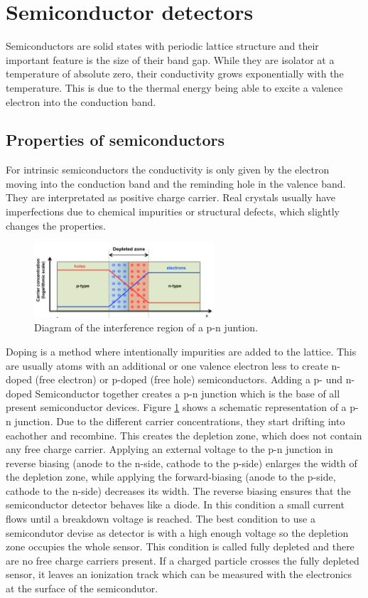 \section{Semiconductor detectors \cite{semi}}
Semiconductors are solid states with periodic lattice structure and their important feature is the size of their band gap. While they are isolator at a temperature of absolute zero, their conductivity grows exponentially with the temperature. This is due to the thermal energy being able to excite a valence electron into the conduction band.
\subsection{Properties of semiconductors}
For intrinsic semiconductors the conductivity is only given by the electron moving into the conduction band and the reminding hole in the valence band. They are interpretated as positive charge carrier. Real crystals usually have imperfections due to chemical impurities or structural defects, which slightly changes the properties. \\
\begin{figure}
	\center
	\includegraphics[width=0.6\textwidth]{graphics/pn.png}
	\caption{Diagram of the interference region of a p-n juntion. \cite{ali}}
	\label{fig:pn}
\end{figure}
Doping is a method where intentionally impurities are added to the lattice. This are usually atoms with an additional or one valence electron less to create n-doped (free electron) or p-doped (free hole) semiconductors. Adding a p- und n-doped Semiconductor together creates a p-n junction which is the base of all present semiconductor devices. Figure \ref{fig:pn} shows a schematic representation of a p-n junction. Due to the different carrier concentrations, they start drifting into eachother and recombine. This creates the depletion zone, which does not contain any free charge carrier. Applying an external voltage to the p-n junction in reverse biasing (anode to the n-side, cathode to the p-side) enlarges the width of the depletion zone, while applying the forward-biasing (anode to the p-side, cathode to the n-side) decreases its width. The reverse biasing ensures that the semiconductor detector behaves like a diode. In this condition a small current flows until a breakdown voltage is reached. The best condition to use a semicondutor devise as detector is with a high enough voltage so the depletion zone occupies the whole sensor. This condition is called fully depleted and there are no free charge carriers present. If a charged particle crosses the fully depleted sensor, it leaves an ionization track which can be measured with the electronics at the surface of the semicondutor. \\

